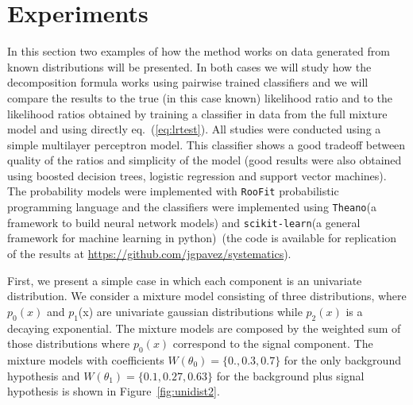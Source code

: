 \documentclass[a4paper]{jpconf}
\begin{document}
\section{Experiments}
 In this section two examples of how the method works on data generated from known distributions will be presented. In both cases we will study how the decomposition formula works using pairwise trained classifiers and we will compare the results to the true (in this case known) likelihood ratio and to the likelihood ratios obtained by training a classifier in data from the full mixture model and using directly eq.~(\ref{eq:lrtest}). All studies were conducted using a simple multilayer perceptron model. This classifier shows a good tradeoff between quality of the ratios and simplicity of the model (good results were also obtained using boosted decision trees, logistic regression and support vector machines). The probability models were implemented with \texttt{RooFit} probabilistic programming language and the classifiers were implemented using \texttt{Theano}(a framework to build neural network models) and \texttt{scikit-learn}(a general framework for machine learning in python)~\cite{Verkerke:2003ir,bergstra:2010-scipy,scikit-learn}(the code is available for replication of the results at \url{https://github.com/jgpavez/systematics}).

First, we present a simple case in which each component is an univariate distribution. We consider a mixture model consisting of three distributions, where $p_0(x)$ and $p_1$(x) are univariate gaussian distributions while $p_2(x)$ is a decaying exponential. The mixture models are composed by the weighted sum of those distributions where $p_0(x)$ correspond to the signal component.  The mixture models with coefficients $W(\theta_0) = \{0., 0.3, 0.7\}$ for the only background hypothesis and $W(\theta_1) = \{0.1, 0.27, 0.63\}$ for the background plus signal hypothesis is shown in Figure~\ref{fig:unidist2}.
 
\end{document}
